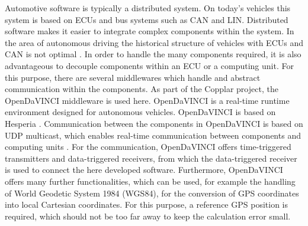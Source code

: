 Automotive software is typically a distributed system. On today's vehicles this system is based on ECUs and bus systems such as CAN and LIN.
Distributed software makes it easier to integrate complex components within the system. In the area of autonomous driving 
the historical structure of vehicles with ECUs and CAN is not optimal \cite{Broy2006}. In order to handle the many components required,
it is also advantageous to decouple components within an ECU or a computing unit. For this purpose,
there are several middlewares which handle and abstract communication within the components. As part of the Copplar project, the OpenDaVINCI middleware is used here.
OpenDaVINCI is a real-time runtime environment designed for autonomous vehicles. OpenDaVINCI is based on Hesperia \cite{Berger2010}. 
Communication between the components in OpenDaVINCI is based on UDP multicast, which enables real-time communication between components and computing units \cite{Kurose2013} .
For the communication, OpenDaVINCI offers time-triggered transmitters and data-triggered receivers, 
from which the data-triggered receiver is used to connect the here developed software. Furthermore, OpenDaVINCI offers many further functionalities,
which can be used, for example the handling of World Geodetic System 1984 (WGS84), for the conversion of GPS coordinates into local Cartesian coordinates.
For this purpose, a reference GPS position is required, which should not be too far away to keep the calculation error small.






